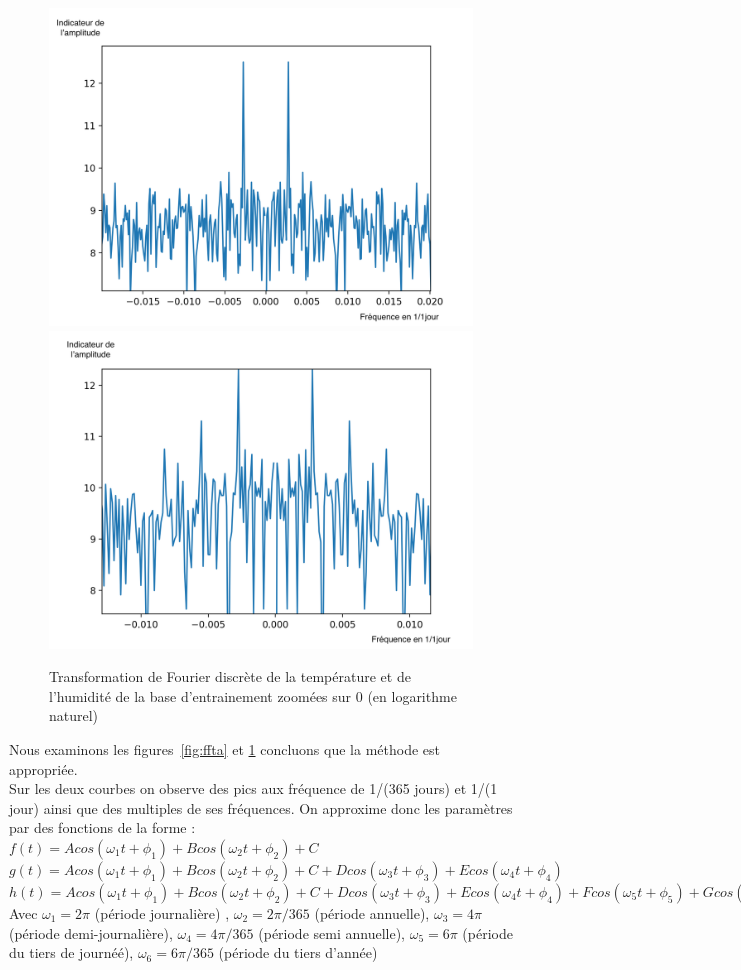 \documentclass[11pt,a4paper]{article}
\begin{document}
\begin{figure} [!h]
\centering
\includegraphics[width=0.48 \textwidth]{./imagesTIPE/fftTZ.png}\quad
\includegraphics[width=0.48 \textwidth]{./imagesTIPE/fftHZ.png}
\caption{\label{fig:fftz} Transformation de Fourier discrète de la température et de l'humidité de la base d'entrainement zoomées sur 0 (en logarithme naturel) }
\end{figure}

Nous examinons les figures~\ref{fig:ffta} et \ref{fig:fftz} concluons que la méthode est appropriée. \\
Sur les deux courbes on observe des pics aux fréquence de 1/(365 jours) et 1/(1 jour) ainsi que des multiples de ses fréquences.
On approxime donc les paramètres par des fonctions de la forme : \\
 $f(t) = A cos (\omega_{1} t + \phi_{1}) + B cos (\omega_{2} t + \phi_{2}) + C$  \\
$g(t) = A cos (\omega_{1} t + \phi_{1}) + B cos (\omega_{2} t + \phi_{2}) + C + D cos (\omega_{3} t + \phi_{3}) + E cos (\omega_{4} t + \phi_{4})$ \\
$h(t) = A cos (\omega_{1} t + \phi_{1}) + B cos (\omega_{2} t + \phi_{2}) + C + D cos (\omega_{3} t + \phi_{3}) + E cos (\omega_{4} t + \phi_{4}) + F cos (\omega_{5} t + \phi_{5}) + G cos (\omega_{6} t + \phi_{6})$ \\ 
Avec $\omega_{1} = 2 \pi$ (période journalière) , $\omega_{2} = 2 \pi /365$ (période annuelle), $\omega_{3} = 4 \pi$ (période demi-journalière), $\omega_{4} = 4\pi/365 $  (période semi annuelle), $\omega_{5} = 6 \pi$ (période du tiers de journéé), $\omega_{6} = 6\pi/365 $  (période du tiers d'année)\\
\end{document}
